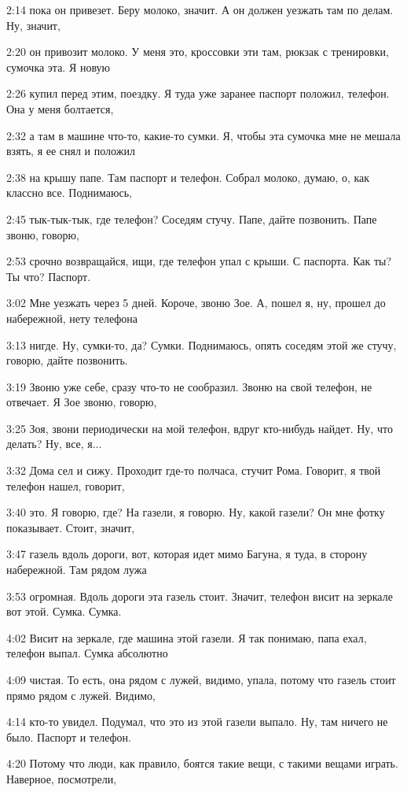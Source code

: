 2:14
пока он привезет. Беру молоко, значит. А он должен уезжать там по делам. Ну, значит,

2:20
он привозит молоко. У меня это, кроссовки эти там, рюкзак с тренировки, сумочка эта. Я новую

2:26
купил перед этим, поездку. Я туда уже заранее паспорт положил, телефон. Она у меня болтается,

2:32
а там в машине что-то, какие-то сумки. Я, чтобы эта сумочка мне не мешала взять, я ее снял и положил

2:38
на крышу папе. Там паспорт и телефон. Собрал молоко, думаю, о, как классно все. Поднимаюсь,

2:45
тык-тык-тык, где телефон? Соседям стучу. Папе, дайте позвонить. Папе звоню, говорю,

2:53
срочно возвращайся, ищи, где телефон упал с крыши. С паспорта. Как ты? Ты что? Паспорт.

3:02
Мне уезжать через 5 дней. Короче, звоню Зое. А, пошел я, ну, прошел до набережной, нету телефона

3:13
нигде. Ну, сумки-то, да? Сумки. Поднимаюсь, опять соседям этой же стучу, говорю, дайте позвонить.

3:19
Звоню уже себе, сразу что-то не сообразил. Звоню на свой телефон, не отвечает. Я Зое звоню, говорю,

3:25
Зоя, звони периодически на мой телефон, вдруг кто-нибудь найдет. Ну, что делать? Ну, все, я...

3:32
Дома сел и сижу. Проходит где-то полчаса, стучит Рома. Говорит, я твой телефон нашел, говорит,

3:40
это. Я говорю, где? На газели, я говорю. Ну, какой газели? Он мне фотку показывает. Стоит, значит,

3:47
газель вдоль дороги, вот, которая идет мимо Багуна, я туда, в сторону набережной. Там рядом лужа

3:53
огромная. Вдоль дороги эта газель стоит. Значит, телефон висит на зеркале вот этой. Сумка. Сумка.

4:02
Висит на зеркале, где машина этой газели. Я так понимаю, папа ехал, телефон выпал. Сумка абсолютно

4:09
чистая. То есть, она рядом с лужей, видимо, упала, потому что газель стоит прямо рядом с лужей. Видимо,

4:14
кто-то увидел. Подумал, что это из этой газели выпало. Ну, там ничего не было. Паспорт и телефон.

4:20
Потому что люди, как правило, боятся такие вещи, с такими вещами играть. Наверное, посмотрели,

